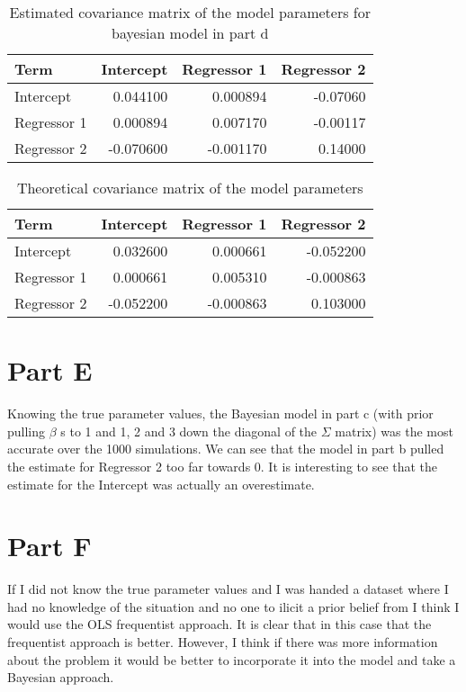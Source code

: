 \documentclass[]{book}
\begin{document}
\begin{table}

\caption{\label{tab:bayes-d-est-vcov-q3}Estimated covariance matrix of the model parameters for bayesian model in part d}
\centering
\begin{tabular}[t]{lrrr}
\toprule
Term & Intercept & Regressor 1 & Regressor 2\\
\midrule
Intercept & 0.044100 & 0.000894 & -0.07060\\
Regressor 1 & 0.000894 & 0.007170 & -0.00117\\
Regressor 2 & -0.070600 & -0.001170 & 0.14000\\
\bottomrule
\end{tabular}
\end{table}

\begin{table}

\caption{\label{tab:theory-vcov-d-q3}Theoretical covariance matrix of the model parameters}
\centering
\begin{tabular}[t]{lrrr}
\toprule
Term & Intercept & Regressor 1 & Regressor 2\\
\midrule
Intercept & 0.032600 & 0.000661 & -0.052200\\
Regressor 1 & 0.000661 & 0.005310 & -0.000863\\
Regressor 2 & -0.052200 & -0.000863 & 0.103000\\
\bottomrule
\end{tabular}
\end{table}

\hypertarget{part-e-1}{%
\section{Part E}\label{part-e-1}}

Knowing the true parameter values, the Bayesian model in part c (with prior pulling \(\beta\) s to 1 and 1, 2 and 3 down the diagonal of the \(\Sigma\) matrix) was the most accurate over the 1000 simulations. We can see that the model in part b pulled the estimate for Regressor 2 too far towards 0. It is interesting to see that the estimate for the Intercept was actually an overestimate.

\hypertarget{part-f-1}{%
\section{Part F}\label{part-f-1}}

If I did not know the true parameter values and I was handed a dataset where I had no knowledge of the situation and no one to ilicit a prior belief from I think I would use the OLS frequentist approach. It is clear that in this case that the frequentist approach is better. However, I think if there was more information about the problem it would be better to incorporate it into the model and take a Bayesian approach.
\end{document}
